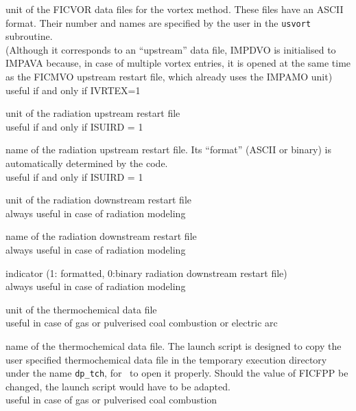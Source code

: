 {unit of the FICVOR data files for the vortex method. These files have an ASCII
format. Their number and names are specified by the user in the \texttt{usvort} subroutine.\\
(Although it corresponds to an ``upstream'' data file, IMPDVO is initialised to
IMPAVA because, in case of multiple vortex entries, it is opened at the same time
as the FICMVO upstream restart file, which already uses the IMPAMO unit)\\ 
useful if and only if IVRTEX=1}



{unit of the radiation upstream restart file\\
useful if and only if ISUIRD = 1}

{name of the radiation upstream restart file. Its ``format'' (ASCII or
binary) is automatically determined by the code.\\ 
useful if and only if ISUIRD = 1}

{unit of the radiation downstream restart file\\ 
always useful in case of radiation modeling}

{name of the radiation downstream restart file \\
always useful in case of radiation modeling}

{indicator (1: formatted, 0:binary radiation downstream restart file)\\
always useful in case of radiation modeling}




{unit of the thermochemical data file\\ 
useful in case of gas or pulverised coal combustion or electric arc}

{name of the thermochemical data file. The launch script is designed to copy the
user specified thermochemical data file in the temporary execution directory
under the name \texttt{dp\_tch}, for \CS\ to open it properly. Should the value
of FICFPP be changed, the launch script would have to be adapted.\\
useful in case of gas or pulverised coal combustion}

